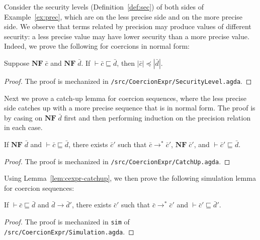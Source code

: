 Consider the security levels (Definition~\ref{def:sec}) of both sides
of Example~\ref{ex:prec}, which are \low on the less precise side and
\high on the more precise side.
We observe that \Surface terms related by precision may produce
values of different security: a less precise value may have lower
security than a more precise value. Indeed, we prove the following for
coercions in normal form:

\begin{lemma}
\label{lem:prec-sec}
Suppose $\mathbf{NF}\; \bar{c}$ and $\mathbf{NF}\; \bar{d}$. If $\vdash \bar{c} \sqsubseteq \bar{d}$, then $| \bar{c} | \preccurlyeq | \bar{d} |$.
\end{lemma}
\begin{proof}
  The proof is mechanized in \texttt{/src/CoercionExpr/SecurityLevel.agda}.
\end{proof}

Next we prove a catch-up lemma for coercion sequences, where the less
precise side catches up with a more precise sequence that is in normal
form. The proof is by casing on $\mathbf{NF}\;\bar{d}$ first and then
performing induction on the precision relation in each case.

\begin{lemma}
\label{lem:cexpr-catchup}
If $\mathbf{NF}\; \bar{d}$ and $\vdash \bar{c} \sqsubseteq \bar{d}$,
there exists $\bar{c}'$ such that $\bar{c} \longrightarrow^{*} \bar{c}'$,
$\mathbf{NF}\; \bar{c}'$, and $\vdash \bar{c}' \sqsubseteq \bar{d}$.
\end{lemma}
\begin{proof}
  The proof is mechanized in \texttt{/src/CoercionExpr/CatchUp.agda}.
\end{proof}

\noindent Using Lemma~\ref{lem:cexpr-catchup}, we then prove the following
simulation lemma for coercion sequences:

\begin{lemma}
\label{lem:cexpr-sim}
If $\vdash \bar{c} \sqsubseteq \bar{d}$ and $\bar{d} \longrightarrow \bar{d}'$,
there exists $\bar{c}'$ such that $\bar{c} \longrightarrow^{*} \bar{c}'$
and $\vdash \bar{c}' \sqsubseteq \bar{d}'$.
\end{lemma}
\begin{proof}
  The proof is mechanized in \texttt{sim} of \texttt{/src/CoercionExpr/Simulation.agda}.
\end{proof}

